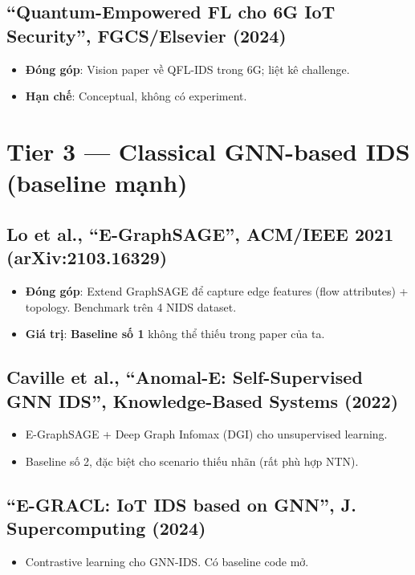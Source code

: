 \documentclass[11pt,a4paper]{article}
\begin{document}
\subsection{``Quantum-Empowered FL cho 6G IoT Security'', FGCS/Elsevier (2024)}
\begin{itemize}
  \item \textbf{Đóng góp}: Vision paper về QFL-IDS trong 6G; liệt kê challenge.
  \item \textbf{Hạn chế}: Conceptual, không có experiment.
\end{itemize}

\section{Tier 3 --- Classical GNN-based IDS (baseline mạnh)}

\subsection{Lo et al., ``E-GraphSAGE'', ACM/IEEE 2021 (arXiv:2103.16329)}
\begin{itemize}
  \item \textbf{Đóng góp}: Extend GraphSAGE để capture edge features (flow attributes) + topology. Benchmark trên 4 NIDS dataset.
  \item \textbf{Giá trị}: \textbf{Baseline số 1} không thể thiếu trong paper của ta.
\end{itemize}

\subsection{Caville et al., ``Anomal-E: Self-Supervised GNN IDS'', Knowledge-Based Systems (2022)}
\begin{itemize}
  \item E-GraphSAGE + Deep Graph Infomax (DGI) cho unsupervised learning.
  \item Baseline số 2, đặc biệt cho scenario thiếu nhãn (rất phù hợp NTN).
\end{itemize}

\subsection{``E-GRACL: IoT IDS based on GNN'', J. Supercomputing (2024)}
\begin{itemize}
  \item Contrastive learning cho GNN-IDS. Có baseline code mở.
\end{itemize}
\end{document}
